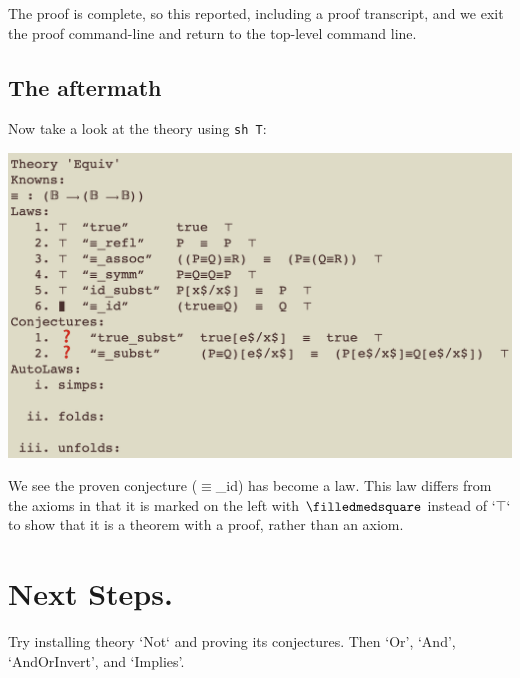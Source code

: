 \documentclass[11pt]{article}
\begin{document}
The proof is complete, so this reported, 
including a proof transcript, and we exit the proof command-line and return to the top-level command line.

\subsection{The aftermath}

Now take a look at the theory using \verb"sh T":

\includegraphics[scale=0.75]{doc/images/aftermath.png}

We see the proven conjecture ($\equiv$\_id) has become a law. This law differs from the axioms in that it is marked on the left with $\filledmedsquare$ instead of `$\top$` to show that it is a theorem with a proof, rather than an axiom.

\section{Next Steps.}

Try installing theory `Not` and proving its conjectures.
Then `Or', `And', `AndOrInvert', and `Implies'.
\end{document}
